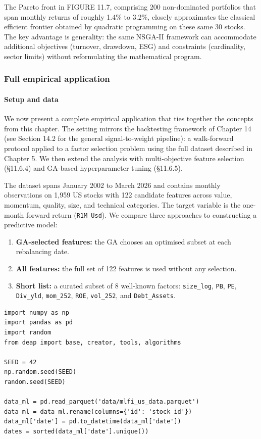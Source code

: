 The Pareto front in FIGURE 11.7, comprising 200 non-dominated portfolios that span monthly returns of roughly 1.4\% to 3.2\%, closely approximates the classical efficient frontier obtained by quadratic programming on these same 30 stocks. The key advantage is generality: the same NSGA-II framework can accommodate additional objectives (turnover, drawdown, ESG) and constraints (cardinality, sector limits) without reformulating the mathematical program.

\subsubsection{Full empirical application}

\paragraph{Setup and data}

We now present a complete empirical application that ties together the concepts from this chapter. The setting mirrors the backtesting framework of Chapter 14 (see Section 14.2 for the general signal-to-weight pipeline): a walk-forward protocol applied to a factor selection problem using the full dataset described in Chapter 5. We then extend the analysis with multi-objective feature selection (§11.6.4) and GA-based hyperparameter tuning (§11.6.5).

The dataset spans January 2002 to March 2026 and contains monthly observations on 1,959 US stocks with 122 candidate features across value, momentum, quality, size, and technical categories. The target variable is the one-month forward return (\texttt{R1M\_Usd}). We compare three approaches to constructing a predictive model:

\begin{enumerate}
\item \textbf{GA-selected features:} the GA chooses an optimised subset at each rebalancing date.
\item \textbf{All features:} the full set of 122 features is used without any selection.
\item \textbf{Short list:} a curated subset of 8 well-known factors: \texttt{size\_log}, \texttt{PB}, \texttt{PE}, \texttt{Div\_yld}, \texttt{mom\_252}, \texttt{ROE}, \texttt{vol\_252}, and \texttt{Debt\_Assets}.
\end{enumerate}

\begin{verbatim}
import numpy as np
import pandas as pd
import random
from deap import base, creator, tools, algorithms

SEED = 42
np.random.seed(SEED)
random.seed(SEED)

data_ml = pd.read_parquet('data/mlfi_us_data.parquet')
data_ml = data_ml.rename(columns={'id': 'stock_id'})
data_ml['date'] = pd.to_datetime(data_ml['date'])
dates = sorted(data_ml['date'].unique())
\end{verbatim}

